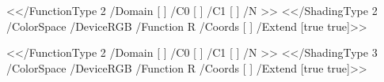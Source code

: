 
  {%
   \immediate\pdfobj
     {<</FunctionType 2
        /Domain [ ]
        /C0 [  ]
        /C1 [  ]
        /N >>}%
   \immediate\pdfobj
     {<</ShadingType 2
        /ColorSpace /DeviceRGB
        /Function \the\pdflastobj{} R
        /Coords [   ]
        /Extend [true true]>>}%
   \stopMPshading}

  {%
   \immediate\pdfobj
     {<</FunctionType 2
        /Domain [ ]
        /C0 [  ]
        /C1 [  ]
        /N >>}%
   \immediate\pdfobj
     {<</ShadingType 3
        /ColorSpace /DeviceRGB
        /Function \the\pdflastobj{} R
        /Coords [     ]
        /Extend [true true]>>}%
   \stopMPshading}

\protect \endinput
